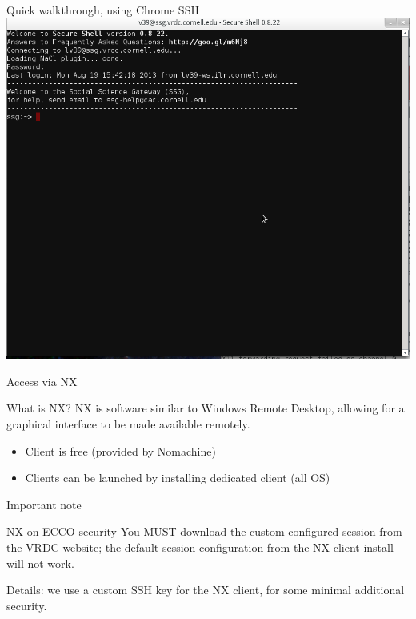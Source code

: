 \documentclass[xcolor=table,compress]{beamer}
\begin{document}
\begin{frame}{Quick walkthrough, using Chrome SSH}
\includegraphics[width=.9\textwidth]{chrome-ssh-screen3.png}
\end{frame}



\begin{frame}{Access via NX}
\begin{block}{What is NX?}
NX is software similar to Windows Remote Desktop, allowing for a graphical interface to be made 
available remotely.
\end{block}
\begin{itemize}
\item Client is free (provided by Nomachine)
\item Clients can be launched by installing dedicated client (all OS)  
\end{itemize}
\end{frame}


\begin{frame}{Important note}
\begin{block}{NX on ECCO security}
You MUST download the custom-configured session from the VRDC website; the default session 
configuration from the NX client install will not work.
\end{block}
\tiny Details: we use a custom SSH key for the NX client, for some minimal additional security.
\end{frame}
\end{document}
